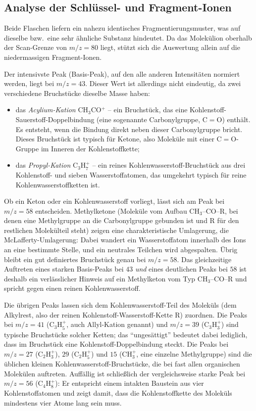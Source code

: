 \documentclass{article}
\begin{document}
\subsection*{Analyse der Schlüssel- und Fragment-Ionen}

Beide Flaschen liefern ein nahezu identisches Fragmentierungsmuster,
was auf dieselbe bzw.\ eine sehr ähnliche Substanz hindeutet. Da das
Molekülion oberhalb der Scan-Grenze von $m/z = 80$ liegt, stützt sich
die Auswertung allein auf die niedermassigen Fragment-Ionen.

Der intensivste Peak (Basis-Peak), auf den alle anderen Intensitäten
normiert werden, liegt bei $m/z = 43$. Dieser Wert ist allerdings
nicht eindeutig, da zwei verschiedene Bruchstücke dieselbe Masse haben:
\begin{itemize}
  \item das \emph{Acylium-Kation} CH$_3$CO$^+$ -- ein Bruchstück, das
    eine Kohlenstoff-Sauerstoff-Doppelbindung (eine sogenannte
    Carbonylgruppe, $\mathrm{C{=}O}$) enthält. Es entsteht, wenn die
    Bindung direkt neben dieser Carbonylgruppe bricht. Dieses Bruchstück
    ist typisch für Ketone, also Moleküle mit einer $\mathrm{C{=}O}$-Gruppe
    im Inneren der Kohlenstoffkette;
  \item das \emph{Propyl-Kation} C$_3$H$_7^+$ -- ein reines
    Kohlenwasserstoff-Bruchstück aus drei Kohlenstoff- und sieben
    Wasserstoffatomen, das umgekehrt typisch für reine
    Kohlenwasserstoffketten ist.
\end{itemize}

Ob ein Keton oder ein Kohlenwasserstoff vorliegt, lässt sich am Peak bei
$m/z = 58$ entscheiden. Methylketone (Moleküle vom Aufbau
CH$_3${--}CO{--}R, bei denen eine Methylgruppe an die Carbonylgruppe
gebunden ist und R für den restlichen Molekülteil steht) zeigen eine
charakteristische Umlagerung, die McLafferty-Umlagerung: Dabei wandert
ein Wasserstoffatom innerhalb des Ions an eine bestimmte Stelle, und ein
neutrales Teilchen wird abgespalten. Übrig bleibt ein gut definiertes
Bruchstück genau bei $m/z = 58$. Das gleichzeitige Auftreten eines
starken Basis-Peaks bei $43$ \emph{und} eines deutlichen Peaks bei
$58$ ist deshalb ein verlässlicher Hinweis auf ein Methylketon vom Typ
CH$_3${--}CO{--}R und spricht gegen einen reinen Kohlenwasserstoff.

Die übrigen Peaks lassen sich dem Kohlenwasserstoff-Teil des Moleküls
(dem Alkylrest, also der reinen Kohlenstoff-Wasserstoff-Kette R)
zuordnen. Die Peaks bei $m/z = 41$ (C$_3$H$_5^+$, auch Allyl-Kation
genannt) und $m/z = 39$ (C$_3$H$_3^+$) sind typische Bruchstücke
solcher Ketten; das ``ungesättigt'' bedeutet dabei lediglich, dass im
Bruchstück eine Kohlenstoff-Doppelbindung steckt. Die Peaks bei
$m/z = 27$ (C$_2$H$_3^+$), $29$ (C$_2$H$_5^+$) und $15$
(CH$_3^+$, eine einzelne Methylgruppe) sind die üblichen kleinen
Kohlenwasserstoff-Bruchstücke, die bei fast allen organischen Molekülen
auftreten. Auffällig ist schließlich der vergleichsweise starke Peak bei
$m/z = 56$ (C$_4$H$_8^+$): Er entspricht einem intakten Baustein aus
vier Kohlenstoffatomen und zeigt damit, dass die Kohlenstoffkette des
Moleküls mindestens vier Atome lang sein muss.
\end{document}

